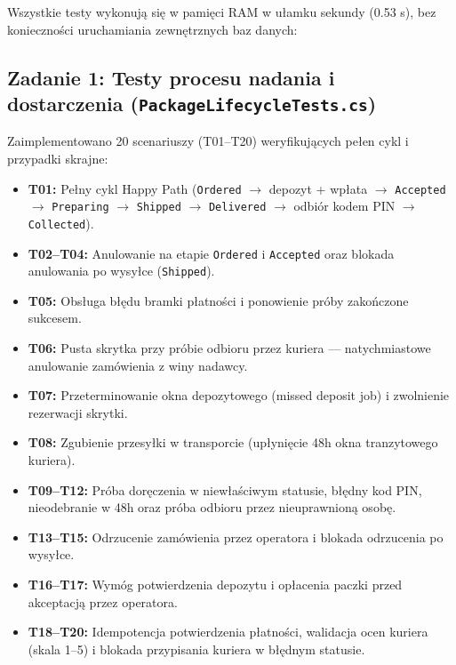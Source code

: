 \documentclass[10.5pt,a4paper]{article}
\begin{document}
Wszystkie testy wykonują się w pamięci RAM w ułamku sekundy (0.53 s), bez konieczności uruchamiania zewnętrznych baz danych:

\subsection{Zadanie 1: Testy procesu nadania i dostarczenia (\texttt{PackageLifecycleTests.cs})}
Zaimplementowano 20 scenariuszy (T01--T20) weryfikujących pełen cykl i przypadki skrajne:
\begin{itemize}[leftmargin=*,itemsep=1.5pt]
    \item \textbf{T01:} Pełny cykl Happy Path (\texttt{Ordered} $\rightarrow$ depozyt + wpłata $\rightarrow$ \texttt{Accepted} $\rightarrow$ \texttt{Preparing} $\rightarrow$ \texttt{Shipped} $\rightarrow$ \texttt{Delivered} $\rightarrow$ odbiór kodem PIN $\rightarrow$ \texttt{Collected}).
    \item \textbf{T02--T04:} Anulowanie na etapie \texttt{Ordered} i \texttt{Accepted} oraz blokada anulowania po wysyłce (\texttt{Shipped}).
    \item \textbf{T05:} Obsługa błędu bramki płatności i ponowienie próby zakończone sukcesem.
    \item \textbf{T06:} Pusta skrytka przy próbie odbioru przez kuriera --- natychmiastowe anulowanie zamówienia z winy nadawcy.
    \item \textbf{T07:} Przeterminowanie okna depozytowego (missed deposit job) i zwolnienie rezerwacji skrytki.
    \item \textbf{T08:} Zgubienie przesyłki w transporcie (upłynięcie 48h okna tranzytowego kuriera).
    \item \textbf{T09--T12:} Próba doręczenia w niewłaściwym statusie, błędny kod PIN, nieodebranie w 48h oraz próba odbioru przez nieuprawnioną osobę.
    \item \textbf{T13--T15:} Odrzucenie zamówienia przez operatora i blokada odrzucenia po wysyłce.
    \item \textbf{T16--T17:} Wymóg potwierdzenia depozytu i opłacenia paczki przed akceptacją przez operatora.
    \item \textbf{T18--T20:} Idempotencja potwierdzenia płatności, walidacja ocen kuriera (skala 1--5) i blokada przypisania kuriera w błędnym statusie.
\end{itemize}
\end{document}
